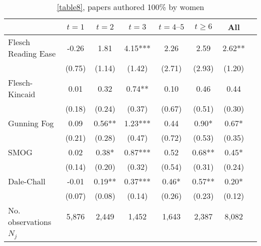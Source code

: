 \begin{table}
    \footnotesize
    \centering
    \begin{threeparttable}
        \caption{\autoref{table8}, papers authored 100\% by women}
        \label{table8XC}
        \begin{tabular}{p{3cm}S@{}S@{}S@{}S@{}S@{}S@{}S@{}}
            \toprule
            &{\(t=1\)}&{\(t=2\)}&{\(t=3\)}&{\(t=4\text{--}5\)}&{\(t\ge6\)}&{All}\\
            \midrule
            Flesch Reading Ease           &       -0.26   &        1.81   &        4.15***&        2.26   &        2.59   &        2.62** \\
                                          &      (0.75)   &      (1.14)   &      (1.42)   &      (2.71)   &      (2.93)   &      (1.20)   \\
            Flesch-Kincaid                &        0.01   &        0.32   &        0.74** &        0.10   &        0.46   &        0.44   \\
                                          &      (0.18)   &      (0.24)   &      (0.37)   &      (0.67)   &      (0.51)   &      (0.30)   \\
            Gunning Fog                   &        0.09   &        0.56** &        1.23***&        0.44   &        0.90*  &        0.67*  \\
                                          &      (0.21)   &      (0.28)   &      (0.47)   &      (0.72)   &      (0.53)   &      (0.35)   \\
            SMOG                          &        0.02   &        0.38*  &        0.87***&        0.52   &        0.68** &        0.45*  \\
                                          &      (0.14)   &      (0.20)   &      (0.32)   &      (0.54)   &      (0.31)   &      (0.24)   \\
            Dale-Chall                    &       -0.01   &        0.19** &        0.37***&        0.46*  &        0.57** &        0.20*  \\
                                          &      (0.07)   &      (0.08)   &      (0.14)   &      (0.26)   &      (0.23)   &      (0.12)   \\
            \midrule
            No. observations              &       5,876   &       2,449   &       1,452   &       1,643   &       2,387   &       8,082   \\
            \(N_j\)                       &           {}   &           {}   &           {}   &           {}   &           {}   &           {}   \\

\end{tabular}
\end{threeparttable}
\end{table}

